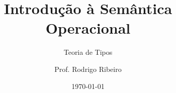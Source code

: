 \documentclass{beamer}
\title{Introdução à Semântica Operacional}
\subtitle{Teoria de Tipos}
\author[Prof. Rodrigo Ribeiro]{Prof. Rodrigo Ribeiro}
\institute{Departamento de Computação e Sistemas}
\date{\today}
\begin{document}
   \begin{frame}
        \titlepage
   \end{frame}
\end{document}
